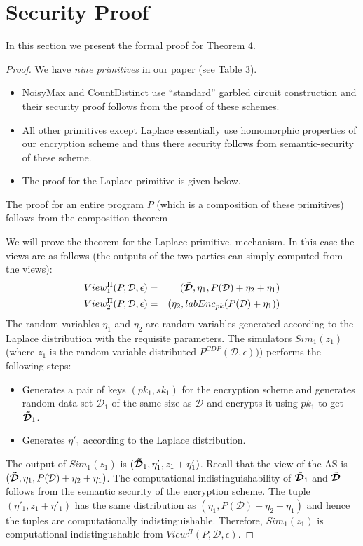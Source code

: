 \section{Security Proof}
In this section we present the formal proof for Theorem 4.
\begin{proof}
 We have {\it nine primitives} in our paper (see Table 3). 
\begin{itemize}
\item \textsf{NoisyMax} and \textsf{CountDistinct} use
  ``standard'' garbled circuit construction and their security proof
  follows from the proof of these schemes.

\item All other primitives except \textsf{Laplace} essentially use 
homomorphic properties of our encryption scheme and thus there 
security follows from semantic-security of these scheme.

\item The proof for the \textsf{Laplace} primitive is given below.
\end{itemize}
The proof for an entire program $P$ (which is a composition 
of these primitives) follows from the composition theorem~\cite[Section 7.3.1]{Oded}

We will prove the theorem for the \textsf{Laplace} primitive.
mechanism. In this case the views are as follows (the outputs of the
two parties can simply computed from the views):
\begin{eqnarray*}
View_1^{\Pi}(P,\mathcal{D},\epsilon) & = & (\boldsymbol{\tilde{\mathcal{D}}},\eta_1,P(\mathcal{D})+\eta_2+\eta_1) \\
View_2^{\Pi}(P,\mathcal{D},\epsilon) & = & (\eta_2,labEnc_{pk} (P(\mathcal{D})+\eta_1)) \\
\end{eqnarray*}
The random variables $\eta_1$ and $\eta_2$ are random variables
generated according to the Laplace distribution with the requisite
parameters. The simulators $Sim_1 (z_1)$ (where $z_1$ is the random
variable distributed $P^{CDP}(\mathcal{D},\epsilon))$) performs the
following steps:
\begin{itemize}
\item Generates a pair of keys $(pk_1,sk_1)$ for the encryption scheme
  and generates random data set $\mathcal{D}_1$ of the same size as $\mathcal{D}$ and
  encrypts it using $pk_1$ to get $\boldsymbol{\tilde{\mathcal{D}}}_1$.

\item Generates $\eta'_1$ according to the Laplace distribution.
\end{itemize}
The output of $Sim_1 (z_1)$ is $(\boldsymbol{\tilde{\mathcal{D}}}_1,\eta'_1,z_1+\eta'_1)$.
Recall that the view of the \textsf{AS} is
$(\boldsymbol{\tilde{\mathcal{D}}},\eta_1,P(\mathcal{D})+\eta_2+\eta_1)$.  The computational
indistinguishability of $\boldsymbol{\tilde{\mathcal{D}}}_1$ and $\boldsymbol{\tilde{\mathcal{D}}}$ follows from the
semantic security of the encryption scheme. The tuple
$(\eta'_1,z_1+\eta'_1)$ has the same distribution as
$(\eta_1,P(\mathcal{D})+\eta_2+\eta_1)$ and hence the tuples are
computationally indistinguishable.  Therefore, $Sim_1 (z_1)$ is
computational indistingushable from $View_1^{\Pi}(P,\mathcal{D},\epsilon)$.



\end{proof}

